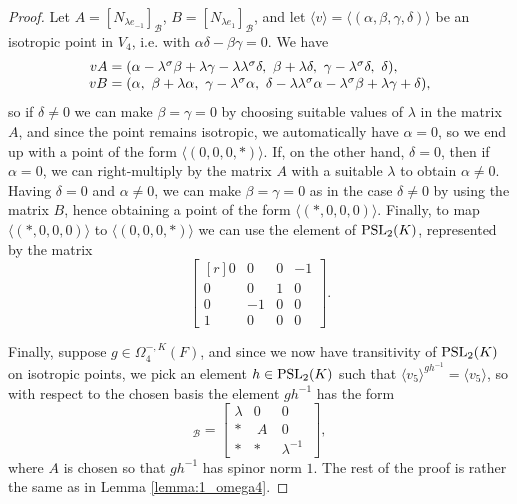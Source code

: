 \begin{proof}
	Let $A = [N_{\lambda e_{-1}}]_{\mathcal{B}}$, $B = [N_{\lambda e_{1}}]_{\mathcal{B}}$, and let
	$\langle v \rangle = \langle (\alpha,\beta,\gamma,\delta) \rangle$ be an isotropic point in $V_4$, i.e. with 
	$\alpha \delta - \beta \gamma = 0$. 
	We have
	\begin{equation*}
		\begin{array}{r@{\;}c@{\;}l}
			v A & = & (\alpha - \lambda^{\s} \beta + \lambda \gamma - \lambda \lambda^{\s} \delta,\  \beta+\lambda\delta,\  
					\gamma-\lambda^{\s}\delta,\  \delta), \\
			
			v B & = & (\alpha,\  \beta+\lambda\alpha,\  \gamma-\lambda^{\s}\alpha,\  
						\delta - \lambda\lambda^{\s} \alpha - \lambda^{\s}\beta + \lambda\gamma + \delta),
		\end{array}
	\end{equation*}
	so if $\delta \neq 0$ we can make $\beta = \gamma = 0$ by choosing suitable values of $\lambda$ in the matrix
	$A$, and since the point remains isotropic, we automatically have $\alpha = 0$, so we end up with a point
	of the form $\langle (0,0,0,*) \rangle$. If, on the other hand, $\delta = 0$, then if $\alpha = 0$, we can right-multiply by
	the matrix $A$ with a suitable $\lambda$ to obtain $\alpha \neq 0$. Having $\delta = 0$ and  $\alpha \neq 0$,
	we can make $\beta = \gamma = 0$ as in the case $\delta \neq 0$ by using the matrix $B$, hence obtaining a point 
	of the form $\langle (*,0,0,0) \rangle$. Finally, to map $\langle (*,0,0,0) \rangle$ to $\langle (0,0,0,*) \rangle$ we can use the element of
	$\mathrm{PSL}_2(K)$, represented by the matrix
	\begin{equation*}
		\begin{bmatrix}[r]
			0 & 0 & 0 & -1 \\
			0 & 0 & 1 & 0 \\
			0 & -1 & 0 & 0 \\
			1 & 0 & 0 & 0
		\end{bmatrix}.
	\end{equation*}
	
	Finally, suppose $g \in \Omega_4^{-,K}(F)$, and since we now have transitivity of $\mathrm{PSL}_2(K)$ on isotropic points,
	we pick an element $h \in \mathrm{PSL}_2(K)$ such that $\langle v_5 \rangle^{g h^{-1}} = \langle v_5 \rangle$, so with respect
	to the chosen basis the element $g h^{-1}$ has the form
	\begin{equation*}
			[g h^{-1}]_{\mathcal{B}} = 
		\left[
	    \begin{array}{c|c|c}
		\lambda & 0 & 0\  \\ \hline 
		* &\  A\   & 0\  \\ \hline
		* & * & \lambda^{-1}\ 
	    \end{array}
	\right],
	\end{equation*}
	where $A$ is chosen so that $g h^{-1}$ has spinor norm $1$. The rest of the proof is rather the same as 
	in Lemma \ref{lemma:1_omega4}. 
\end{proof}

